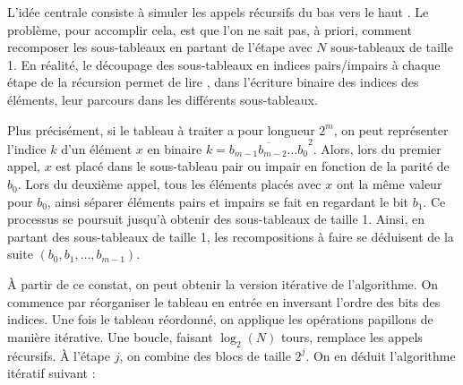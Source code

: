 L'idée centrale consiste à simuler les appels récursifs \og du bas vers le haut \fg . Le problème, pour accomplir cela, est que l'on ne sait pas, à priori, comment recomposer les sous-tableaux en partant de l'étape avec $N$ sous-tableaux de taille 1. En réalité, le découpage des sous-tableaux en indices pairs/impairs à chaque étape de la récursion permet de \og lire \fg , dans l'écriture binaire des indices des éléments, leur parcours dans les différents sous-tableaux.

Plus précisément, si le tableau à traiter a pour longueur $2^m$, on peut représenter l'indice $k$ d'un élément $x$ en binaire $k = \overline{b_{m - 1}b_{m - 2}\dots b_0}^2$. Alors, lors du premier appel, $x$ est placé dans le sous-tableau pair ou impair en fonction de la parité de $b_0$. Lors du deuxième appel, tous les éléments placés avec $x$ ont la même valeur pour $b_0$, ainsi séparer éléments pairs et impairs se fait en regardant le bit $b_1$. Ce processus se poursuit jusqu'à obtenir des sous-tableaux de taille 1. Ainsi, en partant des sous-tableaux de taille 1, les recompositions à faire se déduisent de la suite $\left( b_0, b_1, \dots, b_{m - 1} \right)$.

À partir de ce constat, on peut obtenir la version itérative de l'algorithme. On commence par réorganiser le tableau en entrée en inversant l'ordre des bits des indices. Une fois le tableau réordonné, on applique les opérations papillons de manière itérative. Une boucle, faisant $\log_2 \left( N \right)$ tours, remplace les appels récursifs. À l'étape $j$, on combine des blocs de taille $2^j$. On en déduit l'algorithme itératif suivant :


\begin{algorithm}
\DontPrintSemicolon
{}




\caption{Algorithme de Cooley-Tukey itératif}
\end{algorithm}

